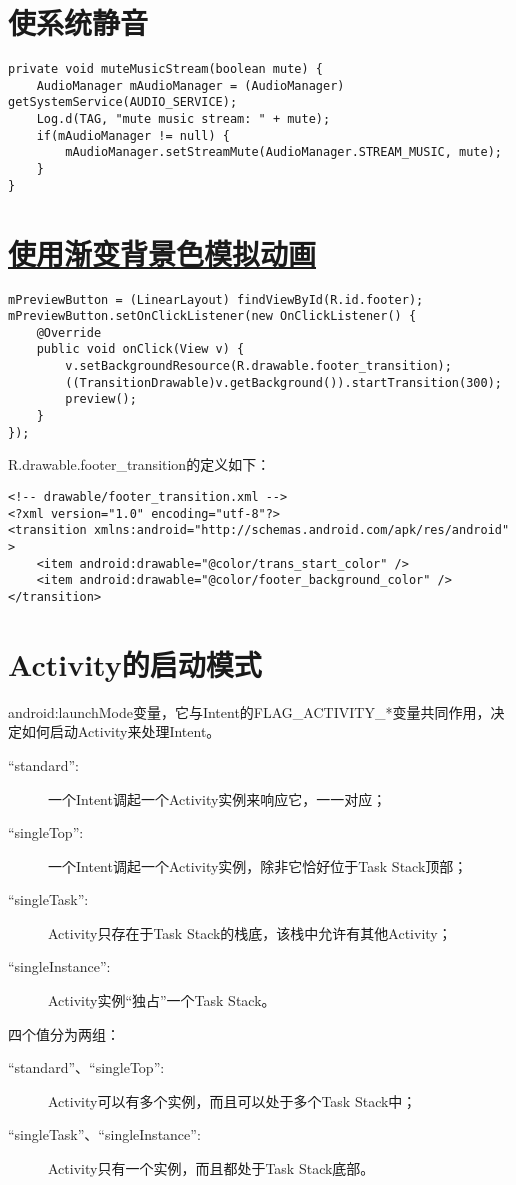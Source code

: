 ﻿\documentclass[a4paper,11pt]{article}
\begin{document}
  \section[使系统静音]{使系统静音}
  \begin{verbatim}
private void muteMusicStream(boolean mute) {
    AudioManager mAudioManager = (AudioManager) getSystemService(AUDIO_SERVICE);
    Log.d(TAG, "mute music stream: " + mute);
    if(mAudioManager != null) {
        mAudioManager.setStreamMute(AudioManager.STREAM_MUSIC, mute);
    }
}
  \end{verbatim}

  \section[使用渐变背景色模拟动画]{\underline{使用渐变背景色模拟动画}}
  \begin{verbatim}
mPreviewButton = (LinearLayout) findViewById(R.id.footer);
mPreviewButton.setOnClickListener(new OnClickListener() {
    @Override
    public void onClick(View v) {
        v.setBackgroundResource(R.drawable.footer_transition);
        ((TransitionDrawable)v.getBackground()).startTransition(300);
        preview();
    }
});
  \end{verbatim}

  R.drawable.footer\_transition的定义如下：

  \begin{verbatim}
<!-- drawable/footer_transition.xml -->
<?xml version="1.0" encoding="utf-8"?>
<transition xmlns:android="http://schemas.android.com/apk/res/android" >
    <item android:drawable="@color/trans_start_color" />
    <item android:drawable="@color/footer_background_color" />
</transition>
  \end{verbatim}


  \section[Activity的启动模式]{Activity的启动模式}
  android:launchMode变量，它与Intent的FLAG\_ACTIVITY\_*变量共同作用，决定如何启动Activity来处理Intent。
  
  \begin{description}
    \item[``standard'':] 一个Intent调起一个Activity实例来响应它，一一对应；
    \item[``singleTop'':] 一个Intent调起一个Activity实例，除非它恰好位于Task Stack顶部；
    \item[``singleTask'':] Activity只存在于Task Stack的栈底，该栈中允许有其他Activity；
    \item[``singleInstance'':] Activity实例“独占”一个Task Stack。
  \end{description}
  
  四个值分为两组：
  
  \begin{description}
    \item[``standard''、``singleTop'':] Activity可以有多个实例，而且可以处于多个Task Stack中；
    \item[``singleTask''、``singleInstance'':] Activity只有一个实例，而且都处于Task Stack底部。
  \end{description}
  
\end{document}
